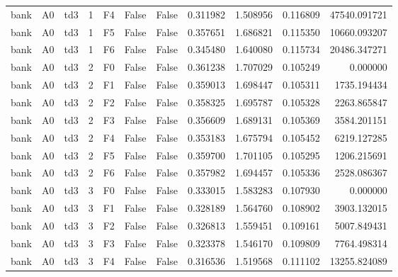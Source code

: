 \begin{tabular}{lllrlllrrrr}
      bank &      A0 &       td3 &     1 &  F4 &           False &            False &  0.311982 &  1.508956 & 0.116809 &     47540.091721 \\
      bank &      A0 &       td3 &     1 &  F5 &           False &            False &  0.357651 &  1.686821 & 0.115350 &     10660.093207 \\
      bank &      A0 &       td3 &     1 &  F6 &           False &            False &  0.345480 &  1.640080 & 0.115734 &     20486.347271 \\
      bank &      A0 &       td3 &     2 &  F0 &           False &            False &  0.361238 &  1.707029 & 0.105249 &         0.000000 \\
      bank &      A0 &       td3 &     2 &  F1 &           False &            False &  0.359013 &  1.698447 & 0.105311 &      1735.194434 \\
      bank &      A0 &       td3 &     2 &  F2 &           False &            False &  0.358325 &  1.695787 & 0.105328 &      2263.865847 \\
      bank &      A0 &       td3 &     2 &  F3 &           False &            False &  0.356609 &  1.689131 & 0.105369 &      3584.201151 \\
      bank &      A0 &       td3 &     2 &  F4 &           False &            False &  0.353183 &  1.675794 & 0.105452 &      6219.127285 \\
      bank &      A0 &       td3 &     2 &  F5 &           False &            False &  0.359700 &  1.701105 & 0.105295 &      1206.215691 \\
      bank &      A0 &       td3 &     2 &  F6 &           False &            False &  0.357982 &  1.694457 & 0.105336 &      2528.086367 \\
      bank &      A0 &       td3 &     3 &  F0 &           False &            False &  0.333015 &  1.583283 & 0.107930 &         0.000000 \\
      bank &      A0 &       td3 &     3 &  F1 &           False &            False &  0.328189 &  1.564760 & 0.108902 &      3903.132015 \\
      bank &      A0 &       td3 &     3 &  F2 &           False &            False &  0.326813 &  1.559451 & 0.109161 &      5007.849431 \\
      bank &      A0 &       td3 &     3 &  F3 &           False &            False &  0.323378 &  1.546170 & 0.109809 &      7764.498314 \\
      bank &      A0 &       td3 &     3 &  F4 &           False &            False &  0.316536 &  1.519568 & 0.111102 &     13255.824089 \\

\end{tabular}
